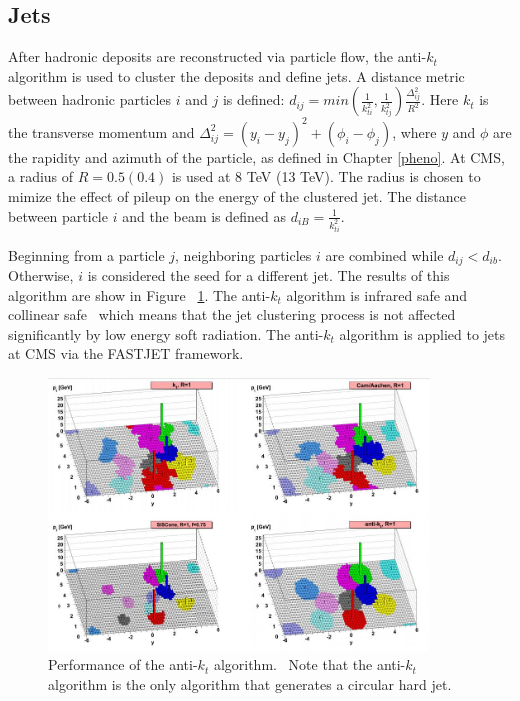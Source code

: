 \documentclass[oneside, letterpaper, oldfontcommands]{memoir}
\begin{document}
\subsection{Jets}\label{jets}
\qquad After hadronic deposits are reconstructed via particle flow, the anti-$k_{t}$ ~\cite{Cacciari:2008gp} algorithm is used to cluster the deposits and define jets. A distance metric between hadronic particles $i$ and $j$ is defined: $d_{ij} = min(\frac{1}{k_{ti}^{2}},\frac{1}{k_{tj}^{2}})\frac{\Delta_{ij}^{2}}{R^{2}}$. Here $k_{t}$ is the transverse momentum and $\Delta_{ij}^{2} = (y_{i}-y_{j})^{2} + (\phi_{i} - \phi_{j})$, where $y$ and $\phi$ are the rapidity and azimuth of the particle, as defined in Chapter \ref{pheno}. At CMS, a radius of $R = 0.5 (0.4)$ is used at 8 TeV (13 TeV). The radius is chosen to mimize the effect of pileup on the energy of the clustered jet. The distance between particle $i$ and the beam is defined as $d_{iB} = \frac{1}{k_{ti}^{2}}$.

\qquad Beginning from a particle $j$, neighboring particles $i$ are combined while $d_{ij} < d_{ib}$. Otherwise, $i$ is considered the seed for a different jet. The results of this algorithm are show in Figure ~\ref{fig:antikt}. The anti-$k_{t}$ algorithm is infrared safe and collinear safe~\cite{Cacciari:2008gp} which means that the jet clustering process is not affected significantly by low energy soft radiation. The anti-$k_{t}$ algorithm is applied to jets at CMS via the FASTJET framework\cite{Cacciari:2011ma}.

\begin{figure}[here]
\includegraphics[width=0.9\textwidth]{antikt.jpg}
\caption{Performance of the anti-$k_{t}$ algorithm.~\cite{Cacciari:2008gp} Note that the anti-$k_{t}$ algorithm is the only algorithm that generates a circular hard jet. }
\label{fig:antikt}
\end{figure}
\end{document}
